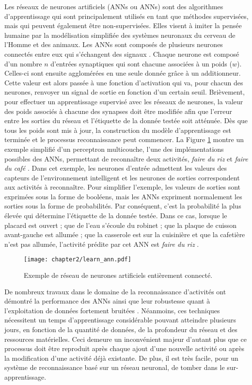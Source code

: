Les réseaux de neurones artificiels (\aclp{ANN} ou \acsp{ANN}) sont des algorithmes d'apprentissage qui sont principalement utilisés en tant que méthodes supervisées, mais qui peuvent également être non-supervisées. Elles visent à imiter la pensée humaine par la modélisation simplifiée des systèmes neuronaux du cerveau de l'Homme et des animaux. Les \acsp{ANN} sont composés de plusieurs neurones connectés entre eux qui s'échangent des signaux \citep{Witten2016}. Chaque neurone est composé d'un nombre $n$ d'entrées synaptiques qui sont chacune associées à un poids ($w$). Celles-ci sont ensuite agglomérées en une seule donnée grâce à un additionneur. Cette valeur est alors passée à une fonction d'activation qui va, pour chacun des neurones, renvoyer un signal de sortie en fonction d'un certain seuil. Brièvement, pour effectuer un apprentissage supervisé avec les réseaux de neurones, la valeur des poids associés à chacune des synapses doit être modifiée afin que l'erreur entre les sorties du réseau et l'étiquette de la donnée testée soit atténuée. Dès que tous les poids sont mis à jour, la construction du modèle d'apprentissage est terminée et le processus reconnaissance peut commencer. La Figure \ref{fig:learn_ann} montre un exemple simplifié d'un perceptron multicouche, l'une des implémentations possibles des \acsp{ANN}, permettant de reconnaître deux activités, \og \textit{faire du riz} \fg et \og \textit{faire du café} \fg. Dans cet exemple, les neurones d'entrée admettent les valeurs des capteurs de l'environnement intelligent et les neurones de sorties correspondent aux activités à reconnaître. Pour simplifier l'exemple, les valeurs de sorties sont exprimées sous la forme de booléens, mais les \acsp{ANN} expriment normalement les sorties sous la forme de probabilités. Par conséquent, c'est la probabilité la plus élevée qui détermine l'étiquette de la donnée testée. Dans ce cas, lorsque le placard est ouvert ; que de l'eau s'écoule du robinet ; que la plaque de cuisson avant-gauche est allumée ; que la casserole est sur la cuisinière et que la cafetière n'est pas allumée, l'activité prédite par cet \acs{ANN} est \og \textit{faire du riz} \fg.

\begin{figure}[H]
	\centering
	\texttt{[image: chapter2/learn\_ann.pdf]}
	\caption{Exemple de réseau de neurones artificiels entièrement connecté.}
	\label{fig:learn_ann}
\end{figure}

De nombreux travaux dans le domaine de la reconnaissance d'activités ont démontré la performance des \acsp{ANN} ainsi que leur robustesse quant à l'exploitation de données fortement bruitées \citep{Parkka2006, Delachaux2013}. Néanmoins, ces techniques nécessitent un temps d'apprentissage considérable pouvant atteindre plusieurs jours, en fonction de la quantité de données, de la profondeur du réseau et des ressources matérielles. Ceci demeure un inconvénient majeur d'autant plus que ce processus doit être reproduit après chaque ajout d'une nouvelle activité ou après la modification d'une activité déjà existante. De plus, il est très facile, pour un système de reconnaissance basé sur un réseau neuronal, de tomber dans le sur-apprentissage.


